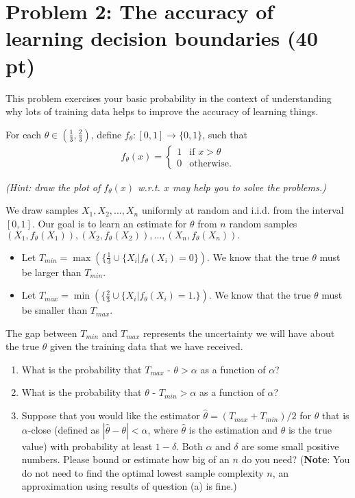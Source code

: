 \documentclass[a4 paper]{article}
\newcommand{\0}{\mathbf{0}}
\begin{document}
\section*{Problem 2: The accuracy of learning decision boundaries (40 pt)}

This problem exercises your basic probability in the context of understanding why lots of training data helps to improve the accuracy of learning things.

For each $\theta \in (\frac{1}{3},\frac{2}{3})$, define $f_\theta : [0,1] \rightarrow \{0,1\}$, such that
\begin{align*}
    f_\theta(x) =
    \begin{cases}
    1 & \text{if } x>\theta \\
    0 & \text{otherwise.}
    \end{cases}
\end{align*}

\textit{(Hint: draw the plot of $f_\theta (x)$ w.r.t. $x$ may help you to solve the problems.)}

We draw samples $X_1,X_2,...,X_n$ uniformly at random and i.i.d. from the interval $[0,1]$. Our goal is to learn an estimate for $\theta$ from $n$ random samples $(X_1, f_\theta (X_1)),(X_2, f_\theta (X_2)),...,(X_n, f_\theta (X_n)).$ 

\begin{itemize}
    \item Let $T_{min} = \max (\{\frac{1}{3} \cup \{X_i | f_\theta(X_i) = 0 \}).$ We know that the true $\theta$ must be larger than $T_{min}.$

    \item Let $T_{max} = \min(\{\frac{2}{3} \cup \{X_i | f_\theta(X_i) = 1. \}).$ We know that the true $\theta$ must be smaller than $T_{max}$.
\end{itemize}

The gap between $T_{min}$ and $T_{max}$ represents the uncertainty we will have about the true $\theta$ given the training data that we have received.

\begin{enumerate}[label=(\alph*)]
    \item What is the probability that $T_{max}$ - $\theta > \alpha$ as a function of $\alpha$? 
    
    \item What is the probability that $\theta$ - $T_{min} > \alpha$ as a function of $\alpha$?
    
    \item Suppose that you would like the estimator $\hat{\theta} = (T_{max} + T_{min})/2$ for $\theta$ that is $\alpha$-close (defined as $|\hat{\theta} - \theta| < \alpha$, where $\hat{\theta}$ is the estimation and $\theta$ is the true value) with probability at least $1 - \delta$. Both $\alpha$ and $\delta$ are some small positive numbers. Please bound or estimate how big of an $n$ do you need? (\textbf{Note}: You do not need to find the optimal lowest sample complexity $n$, an approximation using results of question (a) is fine.)
\end{enumerate}
\end{document}
